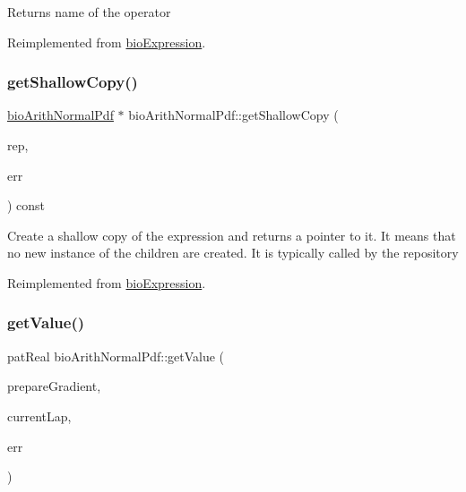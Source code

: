 \begin{DoxyReturn}{Returns}
name of the operator 
\end{DoxyReturn}


Reimplemented from \hyperlink{classbio_expression_a2353a4afb3a2b0af7c63aba086a72bde}{bio\+Expression}.

\mbox{\label{classbio_arith_normal_pdf_aeec0c66c4ba5c8ae0ee9d35be0bf1eb9}} 
\subsubsection{\texorpdfstring{get\+Shallow\+Copy()}{getShallowCopy()}}
{\footnotesize\ttfamily \hyperlink{classbio_arith_normal_pdf}{bio\+Arith\+Normal\+Pdf} $\ast$ bio\+Arith\+Normal\+Pdf\+::get\+Shallow\+Copy (\begin{DoxyParamCaption}\item[{\hyperlink{classbio_expression_repository}{bio\+Expression\+Repository} $\ast$}]{rep,  }\item[{pat\+Error $\ast$\&}]{err }\end{DoxyParamCaption}) const\hspace{0.3cm}{\ttfamily [virtual]}}

Create a shallow copy of the expression and returns a pointer to it. It means that no new instance of the children are created. It is typically called by the repository 

Reimplemented from \hyperlink{classbio_expression_a442534762693b92baaf33928979a1bf8}{bio\+Expression}.

\mbox{\label{classbio_arith_normal_pdf_a6b9af77b48e6a3eb8441df836be67d40}} 
\subsubsection{\texorpdfstring{get\+Value()}{getValue()}}
{\footnotesize\ttfamily pat\+Real bio\+Arith\+Normal\+Pdf\+::get\+Value (\begin{DoxyParamCaption}\item[{pat\+Boolean}]{prepare\+Gradient,  }\item[{pat\+U\+Long}]{current\+Lap,  }\item[{pat\+Error $\ast$\&}]{err }\end{DoxyParamCaption})\hspace{0.3cm}{\ttfamily [virtual]}}

